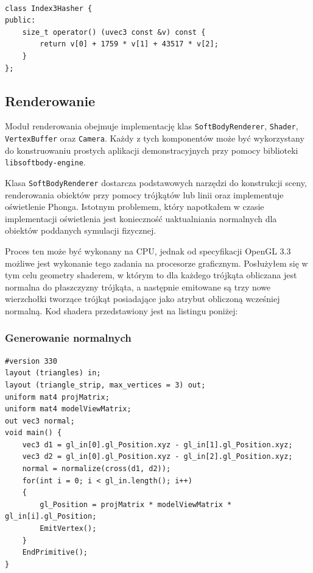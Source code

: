 {\begin{lstlisting}[caption=Funkcja haszujące, label=hashfunc]

class Index3Hasher {
public:
	size_t operator() (uvec3 const &v) const {
		return v[0] + 1759 * v[1] + 43517 * v[2];
	}
};
\end{lstlisting}

\subsection{Renderowanie}
Moduł renderowania obejmuje implementację klas \texttt{SoftBodyRenderer}, \texttt{Shader},
\texttt{VertexBuffer} oraz \texttt{Camera}. Każdy z tych komponentów może
być wykorzystany do konstruowaniu prostych aplikacji demonstracyjnych przy pomocy
biblioteki \texttt{libsoftbody-engine}. 

Klasa \texttt{SoftBodyRenderer} dostarcza podstawowych narzędzi do konstrukcji sceny,
renderowania obiektów przy pomocy trójkątów lub linii oraz implementuje
oświetlenie Phonga. Istotnym problemem, który napotkałem w czasie
implementacji oświetlenia jest konieczność uaktualniania normalnych dla obiektów
poddanych symulacji fizycznej.

Proces ten może być wykonany na CPU, jednak od specyfikacji OpenGL 3.3 możliwe
jest wykonanie tego zadania na procesorze graficznym. Posłużyłem się w tym celu
geometry shaderem, w którym to dla każdego trójkąta obliczana jest normalna do
płaszczyzny trójkąta, a następnie emitowane są trzy nowe
wierzchołki tworzące trójkąt posiadające jako atrybut obliczoną wcześniej
normalną. Kod shadera przedstawiony jest na listingu poniżej:

\subsubsection{Generowanie normalnych}
\begin{lstlisting}[caption=Generacja normalnych w geometry shaderze,
	label=normalne]
#version 330
layout (triangles) in;
layout (triangle_strip, max_vertices = 3) out;
uniform mat4 projMatrix;
uniform mat4 modelViewMatrix;
out vec3 normal;
void main() {
	vec3 d1 = gl_in[0].gl_Position.xyz - gl_in[1].gl_Position.xyz;
	vec3 d2 = gl_in[0].gl_Position.xyz - gl_in[2].gl_Position.xyz;
	normal = normalize(cross(d1, d2));
	for(int i = 0; i < gl_in.length(); i++)
	{
		gl_Position = projMatrix * modelViewMatrix * gl_in[i].gl_Position;
		EmitVertex();
	}
	EndPrimitive();
}
\end{lstlisting}

}
